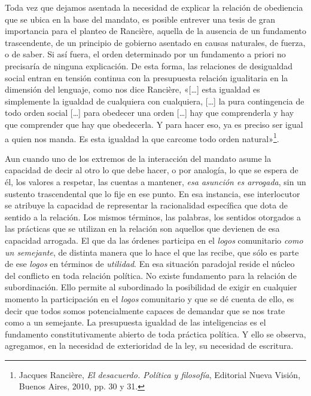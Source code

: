Toda vez que dejamos asentada la necesidad de explicar la relación de obediencia que se ubica en la base del mandato, es posible entrever una tesis de gran importancia para el planteo de Rancière, aquella de la ausencia de un fundamento trascendente, de un principio de gobierno asentado en causas naturales, de fuerza, o de saber. Si así fuera, el orden determinado por un fundamento a priori no precisaría de ninguna explicación. De esta forma, las relaciones de desigualdad social entran en tensión continua con la presupuesta relación igualitaria en la dimensión del lenguaje, como nos dice Rancière, «{[}\ldots{]} esta igualdad es simplemente la igualdad de cualquiera con cualquiera, {[}\ldots{]} la pura contingencia de todo orden social {[}\ldots{]} para obedecer una orden {[}\ldots{]} hay que comprenderla y hay que comprender que hay que obedecerla. Y para hacer eso, ya es preciso ser igual a quien nos manda. Es esta igualdad la que carcome todo orden natural»\footnote{Jacques Rancière, \emph{El desacuerdo. Política y filosofía}, Editorial Nueva Visión, Buenos Aires, 2010, pp. 30 y 31.}.

Aun cuando uno de los extremos de la interacción del mandato asume la capacidad de decir al otro lo que debe hacer, o por analogía, lo que se espera de él, los valores a respetar, las cuentas a mantener, \emph{esa asunción es arrogada}, sin un sustento trascendental que lo fije en ese punto. En esa instancia, ese interlocutor se atribuye la capacidad de representar la racionalidad específica que dota de sentido a la relación. Los mismos términos, las palabras, los sentidos otorgados a las prácticas que se utilizan en la relación son aquellos que devienen de esa capacidad arrogada. El que da las órdenes participa en el \emph{logos} comunitario \emph{como un semejante}, de distinta manera que lo hace el que las recibe, que sólo es parte de ese \emph{logos} en términos de \emph{utilidad}. En esa situación paradojal reside el núcleo del conflicto en toda relación política. No existe fundamento para la relación de subordinación. Ello permite al subordinado la posibilidad de exigir en cualquier momento la participación en el \emph{logos} comunitario y que se dé cuenta de ello, es decir que todos somos potencialmente capaces de demandar que se nos trate como a un semejante. La presupuesta igualdad de las inteligencias es el fundamento constitutivamente abierto de toda práctica política. Y ello se observa, agregamos, en la necesidad de exterioridad de la ley, su necesidad de escritura.

